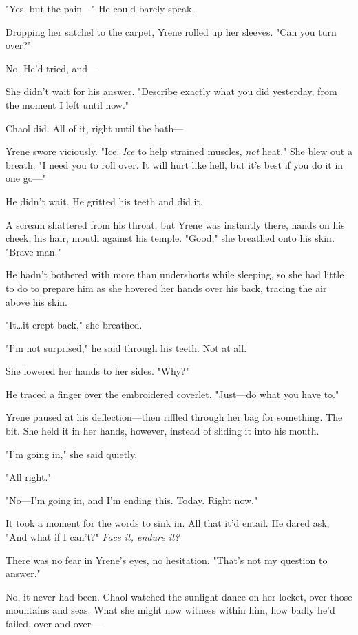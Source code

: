 "Yes, but the pain---" He could barely speak.

Dropping her satchel to the carpet, Yrene rolled up her sleeves.
"Can you turn over?"

No.
He'd tried, and---

She didn't wait for his answer.
"Describe exactly what you did yesterday, from the moment I left until now."

Chaol did.
All of it, right until the bath---

Yrene swore viciously.
"Ice.
\emph{Ice} to help strained muscles,
\emph{not} heat."
She blew out a breath.
"I need you to roll over.
It will hurt like hell, but it's best if you do it in one go---"

He didn't wait.
He gritted his teeth and did it.

A scream shattered from his throat, but Yrene was instantly there, hands on his cheek, his hair, mouth against his temple.
"Good," she breathed onto his skin.
"Brave man."

He hadn't bothered with more than undershorts while sleeping, so she had little to do to prepare him as she hovered her hands over his back, tracing the air above his skin.

"It\ldots it crept back," she breathed.

"I'm not surprised," he said through his teeth.
Not at all.

She lowered her hands to her sides.
"Why?"

He traced a finger over the embroidered coverlet.
"Just---do what you have to."

Yrene paused at his deflection---then riffled through her bag for something.
The bit.
She held it in her hands, however, instead of sliding it into his mouth.

"I'm going in," she said quietly.

"All right."

"No---I'm going in, and I'm ending this.
Today.
Right now."

It took a moment for the words to sink in.
All that it'd entail.
He dared ask, "And what if I can't?"
\emph{Face it, endure it?}

There was no fear in Yrene's eyes, no hesitation.
"That's not my question to answer."

No, it never had been.
Chaol watched the sunlight dance on her locket, over those mountains and seas.
What she might now witness within him, how badly he'd failed, over and over---

